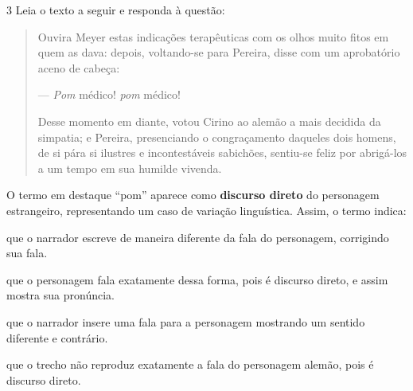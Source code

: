 
\num{3} Leia o texto a seguir e responda à questão:

\begin{quote}
Ouvira Meyer estas indicações terapêuticas com os olhos muito fitos em
quem as dava: depois, voltando-se para Pereira, disse com um aprobatório
aceno de cabeça:

--- \emph{Pom} médico! \emph{pom} médico!

Desse momento em diante, votou Cirino ao alemão a mais decidida da
simpatia; e Pereira, presenciando o congraçamento daqueles dois homens,
de si pára si ilustres e incontestáveis sabichões, sentiu-se feliz por
abrigá-los a um tempo em sua humilde vivenda.

\end{quote}

O termo em destaque ``pom'' aparece como \textbf{discurso direto} do
personagem estrangeiro, representando um caso de variação linguística.
Assim, o termo indica:

\begin{escolha}
\item que o narrador escreve de maneira diferente da fala do personagem,
corrigindo sua fala.

\item que o personagem fala exatamente dessa forma, pois é discurso direto,
e assim mostra sua pronúncia.

\item que o narrador insere uma fala para a personagem mostrando um sentido
diferente e contrário.

\item que o trecho não reproduz exatamente a fala do personagem alemão,
pois é discurso direto.
\end{escolha}


